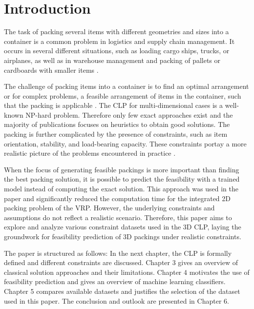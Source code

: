 \chapter{Introduction}

The task of packing several items with different geometries and sizes into a container
is a common problem in logistics and supply chain management. It occurs in several
different situations, such as loading cargo ships, trucks, or airplanes,
as well as in warehouse management and packing of pallets or cardboards with
smaller items \parencite{bortfeldt_constraints_2013}.

The challenge of packing items into a container is to find an optimal arrangement or for
complex problems, a feasible arrangement of items in the container,
such that the packing is applicable \parencite{krebs_advanced_2021}.
The \gls{CLP} for multi-dimensional cases is a well-known NP-hard problem. Therefore
only few exact approaches exist and the majority of publications focuses on
heuristics to obtain good solutions. The packing is further complicated by the presence
of constraints, such as item orientation, stability, and load-bearing capacity.
These constraints portay a more realistic picture of the problems encountered in practice
\parencite{bortfeldt_constraints_2013}.

When the focus of generating feasible packings is more important than finding the best
packing solution, it is possible to predict the feasibility with a trained model instead
of computing the exact solution. This approach was used in the paper \cite{zhang_learning-based_2022}
and significantly reduced the computation time for the integrated 2D packing problem
of the \gls{VRP}. However, the underlying constraints and assumptions do not reflect
a realistic scenario. Therefore, this paper aims to explore and analyze various
constraint datasets used in the 3D \gls{CLP}, laying the groundwork for feasibility
prediction of 3D packings under realistic constraints.

The paper is structured as follows: In the next chapter, the \gls{CLP} is formally defined
and different constraints are discussed. Chapter 3 gives an overview of classical solution
approaches and their limitations. Chapter 4 motivates the use of feasibility prediction
and gives an overview of machine learning classifiers. Chapter 5 compares available datasets
and justifies the selection of the dataset used in this paper. The conclusion and outlook
are presented in Chapter 6.

